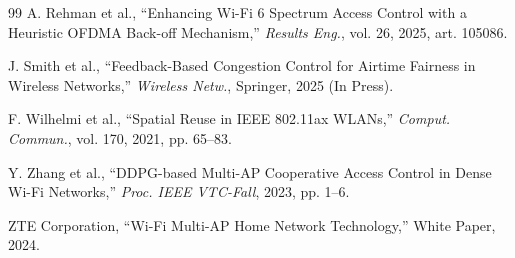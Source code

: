 \documentclass[conference]{IEEEtran}
\begin{document}
\begin{thebibliography}{99}
 A. Rehman et al., ``Enhancing Wi-Fi 6 Spectrum Access Control with a Heuristic OFDMA Back-off Mechanism,'' \textit{Results Eng.}, vol. 26, 2025, art. 105086.

 J. Smith et al., ``Feedback-Based Congestion Control for Airtime Fairness in Wireless Networks,'' \textit{Wireless Netw.}, Springer, 2025 (In Press).

 F. Wilhelmi et al., ``Spatial Reuse in IEEE 802.11ax WLANs,'' \textit{Comput. Commun.}, vol. 170, 2021, pp. 65–83.

 Y. Zhang et al., ``DDPG-based Multi-AP Cooperative Access Control in Dense Wi-Fi Networks,'' \textit{Proc. IEEE VTC-Fall}, 2023, pp. 1–6.

 ZTE Corporation, ``Wi-Fi Multi-AP Home Network Technology,'' White Paper, 2024.

\end{thebibliography}
\end{document}
